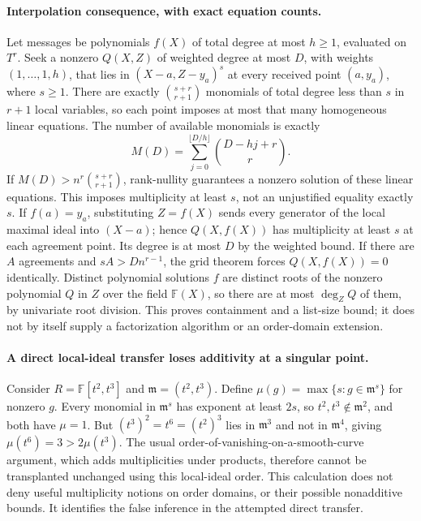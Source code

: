 \documentclass[11pt]{article}
\begin{document}
\paragraph{Interpolation consequence, with exact equation counts.}
Let messages be polynomials $f(X)$ of total degree at most $h\ge1$,
evaluated on $T^r$. Seek a nonzero $Q(X,Z)$ of weighted degree at most
$D$, with weights $(1,\ldots,1,h)$, that lies in
$(X-a,Z-y_a)^s$ at every received point $(a,y_a)$, where $s\ge1$.
There are exactly $\binom{s+r}{r+1}$ monomials of total degree less than
$s$ in $r+1$ local variables, so each point imposes at most that many
homogeneous linear equations. The number of available monomials is exactly
\[
M(D)=\sum_{j=0}^{\lfloor D/h\rfloor}\binom{D-hj+r}{r}.
\]
If $M(D)>n^r\binom{s+r}{r+1}$, rank-nullity guarantees a nonzero solution
of these linear equations. This imposes multiplicity at least $s$, not an
unjustified equality exactly $s$.
If $f(a)=y_a$, substituting $Z=f(X)$ sends every generator of the local
maximal ideal into $(X-a)$; hence $Q(X,f(X))$ has multiplicity at least
$s$ at each agreement point. Its degree is at most $D$ by the weighted
bound. If there are $A$ agreements and $sA>Dn^{r-1}$, the grid theorem
forces $Q(X,f(X))=0$ identically. Distinct polynomial solutions $f$ are
distinct roots of the nonzero polynomial $Q$ in $Z$ over the field
$\mathbb F(X)$, so there are at most $\deg_ZQ$ of them, by univariate
root division. This proves containment and a list-size bound; it does not
by itself supply a factorization algorithm or an order-domain extension.

\paragraph{A direct local-ideal transfer loses additivity at a singular point.}
Consider $R=\mathbb F[t^2,t^3]$ and $\mathfrak m=(t^2,t^3)$.
Define $\mu(g)=\max\{s:g\in\mathfrak m^s\}$ for nonzero $g$.
Every monomial in $\mathfrak m^s$ has exponent at least $2s$, so
$t^2,t^3\notin\mathfrak m^2$, and both have $\mu=1$.
But $(t^3)^2=t^6=(t^2)^3$ lies in $\mathfrak m^3$ and not in
$\mathfrak m^4$, giving $\mu(t^6)=3>2\mu(t^3)$.
The usual order-of-vanishing-on-a-smooth-curve argument, which adds
multiplicities under products, therefore cannot be transplanted unchanged
using this local-ideal order. This calculation does not deny useful
multiplicity notions on order domains, or their possible nonadditive bounds.
It identifies the false inference in the attempted direct transfer.
\end{document}
